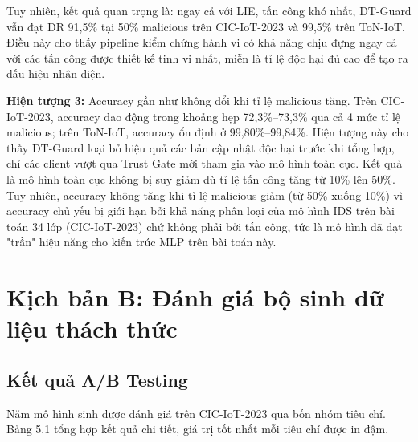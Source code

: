 Tuy nhiên, kết quả quan trọng là: ngay cả với LIE, tấn công khó nhất, DT-Guard vẫn đạt DR 91,5\% tại 50\% malicious trên CIC-IoT-2023 và 99,5\% trên ToN-IoT. Điều này cho thấy pipeline kiểm chứng hành vi có khả năng chịu đựng ngay cả với các tấn công được thiết kế tinh vi nhất, miễn là tỉ lệ độc hại đủ cao để tạo ra dấu hiệu nhận diện.

\textbf{Hiện tượng 3:} Accuracy gần như không đổi khi tỉ lệ malicious tăng. Trên CIC-IoT-2023, accuracy dao động trong khoảng hẹp 72,3\%--73,3\% qua cả 4 mức tỉ lệ malicious; trên ToN-IoT, accuracy ổn định ở 99,80\%--99,84\%. Hiện tượng này cho thấy DT-Guard loại bỏ hiệu quả các bản cập nhật độc hại trước khi tổng hợp, chỉ các client vượt qua Trust Gate mới tham gia vào mô hình toàn cục. Kết quả là mô hình toàn cục không bị suy giảm dù tỉ lệ tấn công tăng từ 10\% lên 50\%. Tuy nhiên, accuracy không tăng khi tỉ lệ malicious giảm (từ 50\% xuống 10\%) vì accuracy chủ yếu bị giới hạn bởi khả năng phân loại của mô hình IDS trên bài toán 34 lớp (CIC-IoT-2023) chứ không phải bởi tấn công, tức là mô hình đã đạt "trần" hiệu năng cho kiến trúc MLP trên bài toán này.

\section{Kịch bản B: Đánh giá bộ sinh dữ liệu thách thức}

\subsection{Kết quả A/B Testing}
Năm mô hình sinh được đánh giá trên CIC-IoT-2023 qua bốn nhóm tiêu chí. Bảng 5.1 tổng hợp kết quả chi tiết, giá trị tốt nhất mỗi tiêu chí được in đậm.

